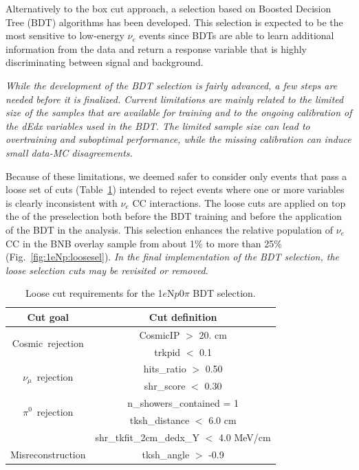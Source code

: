 \documentclass[a4paper]{article}
\newcommand{\nue}{$\nu_e$ }
\newcommand{\nuecc}{$\nu_e$ CC\xspace}
\newcommand{\npsel}{1$e$N$p$0$\pi$ }
\begin{document}
Alternatively to the box cut approach, a selection based on Boosted Decision Tree (BDT) algorithms has been developed. This selection is expected to be the most sensitive to low-energy \nue events since BDTs are able to learn additional information from the data and return a response variable that is highly discriminating between signal and background. 

\emph{While the development of the BDT selection is fairly advanced, a few steps are needed before it is finalized. Current limitations are mainly related to the limited size of the samples that are available for training and to the ongoing calibration of the dEdx variables used in the BDT. The limited sample size can lead to overtraining and suboptimal performance, while the missing calibration can induce small data-MC disagreements.} 

Because of these limitations, we deemed safer to consider only events that pass a loose set of cuts (Table~\ref{tab:1eNp:loosecut}) intended to reject events where one or more variables is clearly inconsistent with \nuecc interactions. The loose cuts are applied on top the of the preselection both before the BDT training and before the application of the BDT in the analysis. This selection enhances the relative population of \nuecc in the BNB overlay sample from about 1\% to more than 25\% (Fig.~\ref{fig:1eNp:loosesel}). \emph{In the final implementation of the BDT selection, the loose selection cuts may be revisited or removed}.
\begin{table}[h!]
\centering
\setlength{\tabcolsep}{10pt}
\renewcommand{\arraystretch}{1.25}
 \begin{tabular}{| c | c |} 
 \hline
 Cut goal & Cut definition \\
 \hline\hline
\multirow{2}{*}{Cosmic~rejection} & CosmicIP $>$ 20. \si{\cm} \\
& trkpid $<$ 0.1 \\
 \hline
\multirow{2}{*}{$\nu_\mu$~rejection} & hits\_ratio $>$ 0.50 \\
 & shr\_score $<$ 0.30 \\
 \hline
\multirow{2}{*}{$\pi^0$~rejection} & n\_showers\_contained = 1 \\
& tksh\_distance $<$ 6.0 \si{\cm} \\
& shr\_tkfit\_2cm\_dedx\_Y $<$ 4.0 \si{\MeV}/\si{\cm} \\
 \hline
Misreconstruction & tksh\_angle $>$ -0.9 \\
 \hline
 \end{tabular}
 \caption{\label{tab:1eNp:loosecut} Loose cut requirements for the \npsel BDT selection.}
\end{table}
\end{document}
